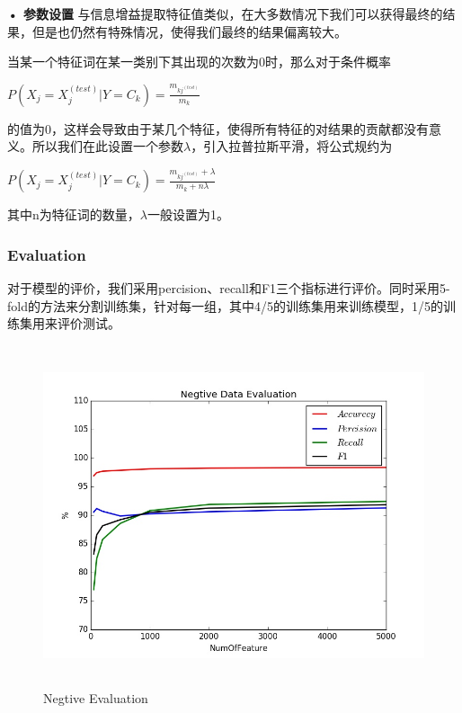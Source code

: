\documentclass[a4paper,11pt,twoside,openany]{article}
\begin{document}
\begin{CJK*}{UTF8}{gbsn}
\textbf{• 参数设置}
与信息增益提取特征值类似，在大多数情况下我们可以获得最终的结果，但是也仍然有特殊情况，使得我们最终的结果偏离较大。

当某一个特征词在某一类别下其出现的次数为0时，那么对于条件概率
\begin{center}
	 	$P(X_j = X_j^{(test)}|Y=C_k)=\frac{m_{kj^{(test)}}}{m_k}$
\end{center}
的值为0，这样会导致由于某几个特征，使得所有特征的对结果的贡献都没有意义。所以我们在此设置一个参数$\lambda$，引入拉普拉斯平滑，将公式规约为

 \begin{center}
	 	$P(X_j = X_j^{(test)}|Y=C_k)=\frac{m_{kj^{(test)}}+\lambda }{m_k + n\lambda}$
 \end{center}
 
 其中n为特征词的数量，$\lambda$一般设置为1。

\subsubsection{Evaluation}
	对于模型的评价，我们采用percision、recall和F1三个指标进行评价。同时采用5-fold的方法来分割训练集，针对每一组，其中4/5的训练集用来训练模型，1/5的训练集用来评价测试。

\begin{figure}
\centering %
\includegraphics[height=10cm ,width=15cm,angle=0,scale=1]{negtive.jpg}
\caption{\label{Fig:outputfile}Negtive Evaluation } %
\end{figure}


\end{CJK*}
\end{document}
